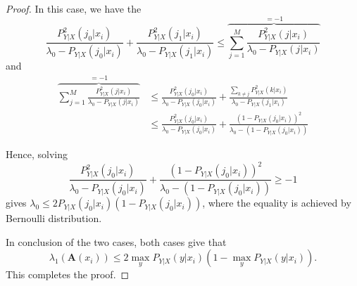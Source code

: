 \documentclass[10pt,a4paper]{amsart}
\begin{document}
\begin{proof}
In this case, we have the
\begin{equation*}
    \frac{P_{Y|X}^2(j_0|x_i)}{\lambda_0-P_{Y|X}(j_0|x_i)}+\frac{P_{Y|X}^2(j_1|x_i)}{\lambda_0-P_{Y|X}(j_1|x_i)}\le\overbrace{\sum_{j=1}^M\frac{P_{Y|X}^2(j|x_i)}{\lambda_0-P_{Y|X}(j|x_i)}}^{=-1}
\end{equation*}
and
\begin{align*}
    \overbrace{\sum_{j=1}^M\frac{P_{Y|X}^2(j|x_i)}{\lambda_0-P_{Y|X}(j|x_i)}}^{=-1} & \le\frac{P_{Y|X}^2(j_0|x_i)}{\lambda_0-P_{Y|X}(j_0|x_i)}+\frac{\sum_{k\ne j}P_{Y|X}^2(k|x_i)}{\lambda_0-P_{Y|X}(j_1|x_i)}\\
    & \le\frac{P_{Y|X}^2(j_0|x_i)}{\lambda_0-P_{Y|X}(j_0|x_i)}+\frac{(1-P_{Y|X}(j_0|x_i))^2}{\lambda_0-(1-P_{Y|X}(j_0|x_i))}
\end{align*}

Hence, solving 
$$
\frac{P_{Y|X}^2(j_0|x_i)}{\lambda_0-P_{Y|X}(j_0|x_i)}+\frac{(1-P_{Y|X}(j_0|x_i))^2}{\lambda_0-(1-P_{Y|X}(j_0|x_i))}\ge-1
$$
gives $\lambda_0\le2P_{Y|X}(j_0|x_i)(1-P_{Y|X}(j_0|x_i))$, where the equality is achieved by Bernoulli distribution.

In conclusion of the two cases, both cases give that
\begin{equation*}
    \lambda_1(\textbf{A}(x_i)) \leq 2\max_y P_{Y|X}(y|x_i)\left(1-\max_y P_{Y|X}(y|x_i)\right).
\end{equation*}
This completes the proof.
\end{proof}
\end{document}
